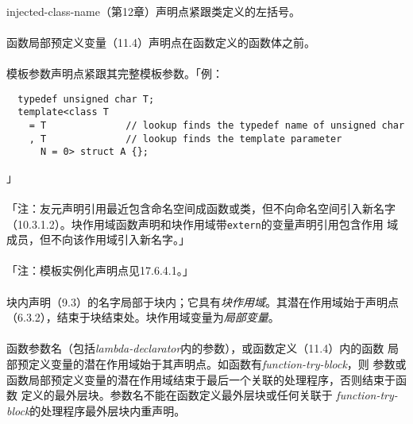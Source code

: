 \paragraph{}
injected-class-name（第12章）声明点紧跟类定义的左括号。

\paragraph{}
函数局部预定义变量（11.4）声明点在函数定义的函数体之前。

\paragraph{}
模板参数声明点紧跟其完整模板参数。「例：
\begin{lstlisting}
  typedef unsigned char T;
  template<class T
    = T              // lookup finds the typedef name of unsigned char
    , T              // lookup finds the template parameter
      N = 0> struct A {};
\end{lstlisting}
」

\paragraph{}
「注：友元声明引用最近包含命名空间成函数或类，但不向命名空间引入新名字
（10.3.1.2）。块作用域函数声明和块作用域带\texttt{extern}的变量声明引用包含作用
域成员，但不向该作用域引入新名字。」

\paragraph{}
「注：模板实例化声明点见17.6.4.1。」


\paragraph{}
块内声明（9.3）的名字局部于块内；它具有\textit{块作用域}。其潜在作用域始于声明点
（6.3.2），结束于块结束处。块作用域变量为\textit{局部变量}。

\paragraph{}
函数参数名（包括\textit{lambda-declarator}内的参数），或函数定义（11.4）内的函数
局部预定义变量的潜在作用域始于其声明点。如函数有\textit{function-try-block}，则
参数或函数局部预定义变量的潜在作用域结束于最后一个关联的处理程序，否则结束于函数
定义的最外层块。参数名不能在函数定义最外层块或任何关联于
\textit{function-try-block}的处理程序最外层块内重声明。


